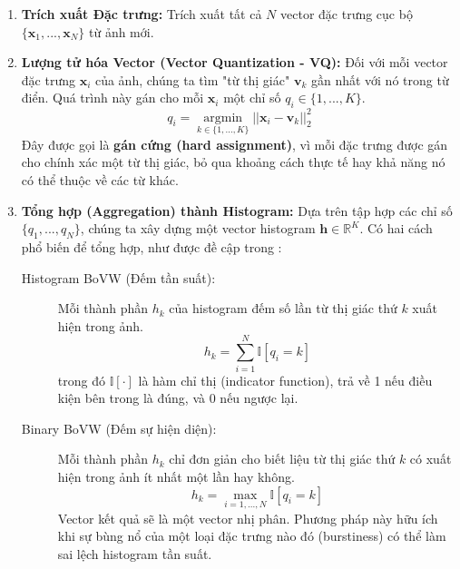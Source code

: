 \begin{enumerate}
    \item \textbf{Trích xuất Đặc trưng:} Trích xuất tất cả $N$ vector đặc trưng cục bộ $\{\mathbf{x}_1, ..., \mathbf{x}_N\}$ từ ảnh mới.
    
    \item \textbf{Lượng tử hóa Vector (Vector Quantization - VQ):} Đối với mỗi vector đặc trưng $\mathbf{x}_i$ của ảnh, chúng ta tìm "từ thị giác" $\mathbf{v}_k$ gần nhất với nó trong từ điển. Quá trình này gán cho mỗi $\mathbf{x}_i$ một chỉ số $q_i \in \{1, ..., K\}$.
    \begin{equation}
        q_i = \underset{k \in \{1, ..., K\}}{\operatorname{argmin}} ||\mathbf{x}_i - \mathbf{v}_k||_2^2
        \label{eq:bovw_assignment}
    \end{equation}
    Đây được gọi là \textbf{gán cứng (hard assignment)}, vì mỗi đặc trưng được gán cho chính xác một từ thị giác, bỏ qua khoảng cách thực tế hay khả năng nó có thể thuộc về các từ khác.
    
    \item \textbf{Tổng hợp (Aggregation) thành Histogram:} Dựa trên tập hợp các chỉ số $\{q_1, ..., q_N\}$, chúng ta xây dựng một vector histogram $\mathbf{h} \in \mathbb{R}^K$. Có hai cách phổ biến để tổng hợp, như được đề cập trong \cite{Gidaris2020}:
    \begin{description}
        \item[Histogram BoVW (Đếm tần suất):] Mỗi thành phần $h_k$ của histogram đếm số lần từ thị giác thứ $k$ xuất hiện trong ảnh.
        \begin{equation}
            h_k = \sum_{i=1}^{N} \mathbb{I}[q_i = k]
            \label{eq:bovw_histogram_count}
        \end{equation}
        trong đó $\mathbb{I}[\cdot]$ là hàm chỉ thị (indicator function), trả về 1 nếu điều kiện bên trong là đúng, và 0 nếu ngược lại.
        \item[Binary BoVW (Đếm sự hiện diện):] Mỗi thành phần $h_k$ chỉ đơn giản cho biết liệu từ thị giác thứ $k$ có xuất hiện trong ảnh ít nhất một lần hay không.
        \begin{equation}
            h_k = \max_{i=1,...,N} \mathbb{I}[q_i = k]
            \label{eq:bovw_binary_count}
        \end{equation}
        Vector kết quả sẽ là một vector nhị phân. Phương pháp này hữu ích khi sự bùng nổ của một loại đặc trưng nào đó (burstiness) có thể làm sai lệch histogram tần suất.
    \end{description}
    

\end{enumerate}

